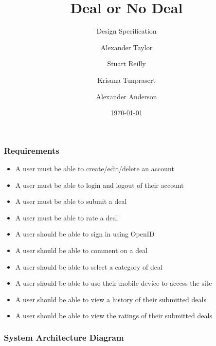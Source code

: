 \documentclass{beamer}
\title{Deal or No Deal}
\subtitle{Design Specification}
\author{Alexander Taylor \and Stuart Reilly \and Krisana Tunprasert \and Alexander Anderson}
\date{\today}
\begin{document}
\frame{\titlepage}

\begin{frame}
	\frametitle{Requirements}
	\begin{itemize}
		\item A user must be able to create/edit/delete an account
		\item A user must be able to login and logout of their account
		\item A user must be able to submit a deal
		\item A user must be able to rate a deal
		\item A user should be able to sign in using OpenID
		\item A user should be able to comment on a deal
		\item A user should be able to select a category of deal
		\item A user should be able to use their mobile device to access the site
		\item A user should be able to view a history of their submitted deals
		\item A user should be able to view the ratings of their submitted deals
	\end{itemize}
\end{frame}

\begin{frame}
	\frametitle{System Architecture Diagram}
	\resizebox{\textwidth}{!}{}
\end{frame}
\end{document}
